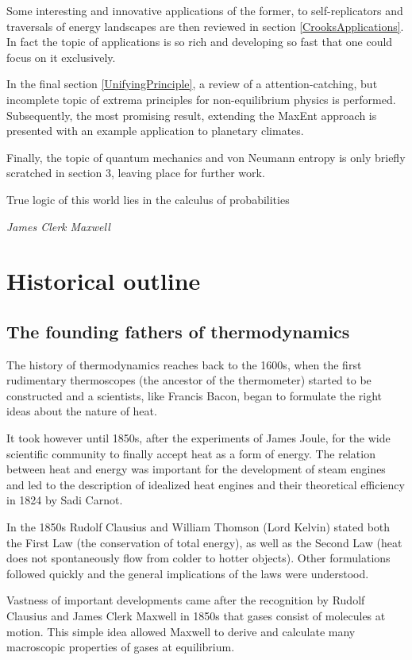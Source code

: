 \documentclass[a4paper,12pt]{article}
\begin{document}
Some interesting and innovative applications of the former, to self-replicators and traversals of energy landscapes are then reviewed in section \ref{CrooksApplications}. In fact the topic of applications is so rich and developing so fast that one could focus on it exclusively.

In the final section \ref{UnifyingPrinciple}, a review of a attention-catching, but incomplete topic of extrema principles for non-equilibrium physics is performed. Subsequently, the most promising result, extending the MaxEnt approach is presented with an example application to planetary climates.

Finally, the topic of quantum mechanics and von Neumann entropy is only briefly scratched in section 3, leaving place for further work.


\newpage
\epigraph{True logic of this world lies in the calculus of probabilities}{\textit{James Clerk Maxwell}}
\section{Historical outline}
\subsection{The founding fathers of thermodynamics}
The history of thermodynamics reaches back to the 1600s, when the first rudimentary thermoscopes (the ancestor of the thermometer) started to be constructed and a scientists, like Francis Bacon, began to formulate the right ideas about the nature of heat. 

It took however until 1850s, after the experiments of James Joule, for the wide scientific community to finally accept heat as a form of energy. The relation between heat and energy was important for the development of steam engines and led to the description of idealized heat engines and their theoretical efficiency in 1824 by Sadi Carnot. 

In the 1850s Rudolf Clausius and William Thomson (Lord Kelvin) stated both the First Law (the conservation of total energy), as well as the Second Law (heat does not spontaneously flow from colder to hotter objects). Other formulations followed quickly and the general implications of the laws were understood. 

Vastness of important developments came after the recognition by Rudolf Clausius and James Clerk Maxwell in 1850s that gases consist of molecules at motion. This simple idea allowed Maxwell to derive and calculate many macroscopic properties of gases at equilibrium. 
\end{document}
